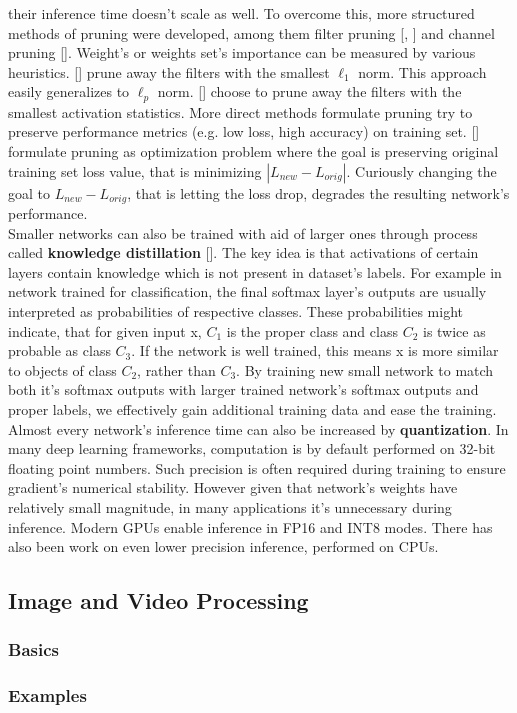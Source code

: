 \documentclass[../Main.tex]{subfiles}
\begin{document}
    their inference time doesn't scale as well. To overcome this, more structured
    methods of pruning were developed, among them filter pruning [\cite{li2016pruning},
    \cite{molchanov2016pruning}]
    and channel pruning [\cite{he2017channel}]. 
    Weight's or weights set's importance can be measured by various heuristics. 
    [\cite{li2016pruning}] prune away the filters with the smallest $\ell_1$ norm.
    This approach easily generalizes to $\ell_p$ norm.
    [\cite{polyak2015}] choose to prune away the filters with
    the smallest activation statistics. More direct methods formulate pruning 
    try to preserve performance metrics (e.g. low loss, high accuracy) on training set. 
    [\cite{molchanov2016pruning}] formulate pruning as optimization problem where
    the goal is preserving original training set loss value, that is minimizing
    $|L_{new} - L_{orig}|$. Curiously changing the goal to $L_{new} - L_{orig}$,
    that is letting the loss drop, degrades the resulting network's performance.\\
    Smaller networks can also be trained with aid of larger ones through process called
    \textbf{knowledge distillation} [\cite{hinton2015distilling}]. 
    The key idea is that activations of certain layers
    contain knowledge which is not present in dataset's labels. For example in network 
    trained for classification, the final softmax layer's outputs are usually 
    interpreted as probabilities of respective classes. These probabilities might indicate,
    that for given input x, $C_1$ is the proper class and class $C_2$ is twice as probable 
    as class $C_3$. If the network is well trained, this means x is more similar to
    objects of class $C_2$, rather than $C_3$. By training new small network to match both
    it's softmax outputs with larger trained network's softmax outputs and proper labels,
    we effectively gain additional training data and ease the training.
    Almost every network's inference time can also be increased by \textbf{quantization}.
    In many deep learning frameworks, computation is by default performed on
    32-bit floating point numbers. Such precision is often required during training to 
    ensure gradient's numerical stability. However given that network's weights have
    relatively small magnitude, in many applications it's unnecessary during inference.
    Modern GPUs enable inference in FP16 and INT8 modes. There has also been work 
    on even lower precision inference, performed on CPUs. 
    
    

\subsection{Image and Video Processing}
    \subsubsection{Basics}
    \subsubsection{Examples}


\biblio %
\end{document}
